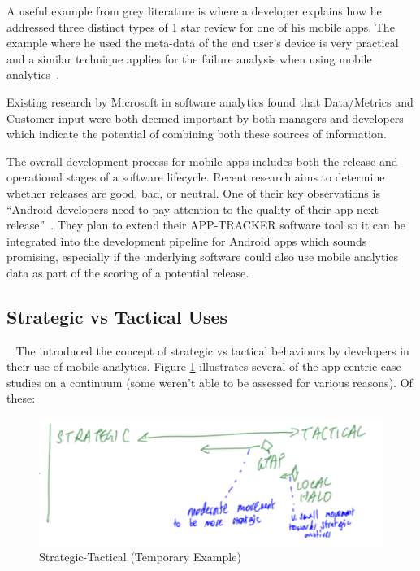 A useful example from grey literature is where a developer explains how he addressed three distinct types of 1 star review for one of his mobile apps. The example where he used the meta-data of the end user's device is very practical and a similar technique applies for the failure analysis when using mobile analytics~.

Existing research by Microsoft in software analytics found that Data/Metrics and Customer input were both deemed important by both managers and developers which indicate the potential of combining both these sources of information.~

The overall development process for mobile apps includes both the release and operational stages of a software lifecycle. Recent research aims to determine whether releases are good, bad, or neutral. One of their key observations is ``Android developers need to pay attention to the quality of their app next release''~. They plan to extend their \uppercase{App-Tracker} software tool so it can be integrated into the development pipeline for Android apps which sounds promising, especially if the underlying software could also use mobile analytics data as part of the scoring of a potential release.


\subsection{Strategic vs Tactical Uses}~\label{aiu-strategic-vs-tactical-uses-topic}
The  introduced the concept of strategic vs tactical behaviours by developers in their use of mobile analytics. Figure \ref{fig:aiu-strategic-tactical-example} illustrates several of the app-centric case studies on a continuum (some weren't able to be assessed for various reasons). Of these:

\begin{figure}
    \centering
    \includegraphics[width=\linewidth]{images/rough-sketches/aiu-strategic-tactical-example.pdf}
    \caption{Strategic-Tactical (Temporary Example)}
    \label{fig:aiu-strategic-tactical-example}
\end{figure}

